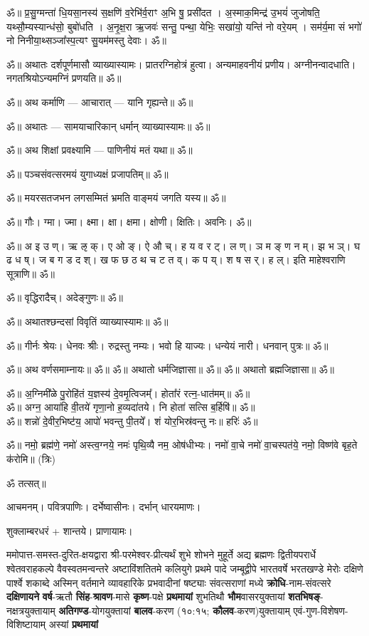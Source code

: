 ॐ॥ प्र॒सु॒ग्मन्ता॑ धि॒यसा॒नस्य॑ स॒क्षणि॑ व॒रेभि॑र्व॒राꣳ अ॒भि षु॒ प्रसी॑दत । अ॒स्माक॒मिन्द्र॑ उ॒भयं॑
जुजोषति॒ यथ्सौ॒म्यस्यान्ध॑सो॒ बुबो॑धति । अ॒नृ॒क्ष॒रा ऋ॒जवः॑ सन्तु॒ पन्था॒ येभिः॒ सखा॑यो॒ यन्ति॑ नो
वरे॒यम् । सम॑र्य॒मा सं भगो॑ नो निनीया॒थ्सञ्जा᳚स्प॒त्यꣳ सु॒यम॑मस्तु देवाः। ॐ॥

ॐ॥ अथातः दर्शपूर्णमासौ व्याख्यास्यामः। प्रातरग्निहोत्रं हुत्वा। अन्यमाहवनीयं प्रणीय।
अग्नीनन्वादधाति। नगतश्रियोऽन्यमग्निं प्रणयति॥ ॐ॥

ॐ॥ अथ कर्माणि — आचारात् — यानि गृह्यन्ते॥ ॐ॥

ॐ॥ अथातः — सामयाचारिकान् धर्मान् व्याख्यास्यामः॥ ॐ॥

ॐ॥ अथ शिक्षां प्रवक्ष्यामि — पाणिनीयं मतं यथा॥ ॐ॥

ॐ॥ पञ्चसंवत्सरमयं युगाध्यक्षं प्रजापतिम्॥ ॐ॥

ॐ॥ मयरसतजभन लगसम्मितं भ्रमति वाङ्मयं जगति यस्य॥ ॐ॥

ॐ॥ गौः। ग्मा। ज्मा। क्ष्मा। क्षा। क्षमा। क्षोणी। क्षितिः। अवनिः। ॐ॥

ॐ॥ अ इ उ ण्। ऋ ऌ क्। ए ओ ङ्। ऐ औ च्। ह य व र ट्। ल ण्। ञ म ङ् ण न म्।
झ भ ञ्। घ ढ ध ष्। ज ब ग ड द श्। ख फ छ ठ थ च ट त व्।
क प य्। श ष स र्। ह ल्। इति माहेश्वराणि सूत्राणि॥ ॐ॥

ॐ॥ वृद्धिरादैच्। अदेङ्गुणः॥ ॐ॥

ॐ॥ अथातश्छन्दसां विवृतिं व्याख्यास्यामः॥ ॐ॥

ॐ॥ गीर्नः श्रेयः। धेनवः श्रीः। रुद्रस्तु नम्यः। भवो हि याज्यः। धन्येयं नारी। धनवान् पुत्रः॥ ॐ॥

ॐ॥ अथ वर्णसमाम्नायः॥ ॐ॥
ॐ॥ अथातो धर्मजिज्ञासा॥ ॐ॥
ॐ॥ अथातो ब्रह्मजिज्ञासा॥ ॐ॥

ॐ॥ अ॒ग्निमी᳚ळे पु॒रोहि॑तं य॒ज्ञस्य॑ दे॒वमृ॒त्विजम्᳚। होता᳚रं रत्न॒-धात॑मम्॥ ॐ॥\\
ॐ॥ अग्न॒ आया॑हि वी॒तये॑ गृणा॒नो ह॒व्यदा॑तये। नि होता॑ सत्सि ब॒र्हिषि॑॥ ॐ॥\\
ॐ॥ शन्नो॑ दे॒वीर॒भिष्ट॑य॒ आपो॑ भवन्तु पी॒तये᳚। शं योर॒भिस्र॑वन्तु नः॥ हरिः॑ ॐ॥

ॐ॥ नमो॒ ब्रह्म॑णे॒ नमो॑ अस्त्व॒ग्नये॒ नमः॑ पृथि॒व्यै नम॒ ओष॑धीभ्यः।
नमो॑ वा॒चे नमो॑ वा॒चस्पत॑ये॒ नमो॒ विष्ण॑वे बृह॒ते क॑रोमि॥ (त्रिः)

ॐ तत्सत्॥


आचमनम्। पवित्रपाणिः। दर्भेष्वासीनः। दर्भान् धारयमाणः।

शुक्लाम्बरधरं + शान्तये। प्राणायामः।

ममोपात्त-समस्त-दुरित-क्षयद्वारा श्री-परमेश्वर-प्रीत्यर्थं शुभे शोभने मुहूर्ते अद्य ब्रह्मणः
द्वितीयपरार्धे श्वेतवराहकल्पे वैवस्वतमन्वन्तरे अष्टाविंशतितमे कलियुगे प्रथमे पादे
जम्बूद्वीपे भारतवर्षे भरतखण्डे मेरोः दक्षिणे पार्श्वे शकाब्दे अस्मिन् वर्तमाने व्यावहारिके
प्रभवादीनां षष्ट्याः संवत्सराणां मध्ये
\textbf{क्रोधि}-नाम-संवत्सरे \textbf{दक्षिणायने} \textbf{वर्ष}-ऋतौ \textbf{सिंह}-\textbf{श्रावण}-मासे \textbf{कृष्ण}-पक्षे \textbf{प्रथमायां} शुभतिथौ \textbf{भौम}\-वासर\-युक्तायां \textbf{शतभिषङ्}-नक्षत्र\-युक्तायाम् \textbf{अतिगण्ड}-योग\-युक्तायां \textbf{बालव}-करण (१०:१५; \textbf{कौलव}-करण)\-युक्तायाम् एवं-गुण-विशेषण-विशिष्टायाम् अस्यां \textbf{प्रथमायां}

